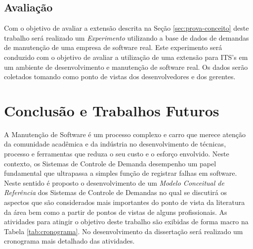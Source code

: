 \documentclass[msc,proposal,hidelot,hideabstract]{ppgccufmg} %
\begin{document}
\section{Avaliação}
\label{sec:avaliacao}

Com o objetivo de avaliar a extensão descrita na Seção \ref{sec:prova-conceito}
deste trabalho será realizado um \textit{Experimento}
\cite{wohlin2012experimentation} utilizando a base de dados de demandas de
manutenção de uma empresa de software real. Este experimento será conduzido com
o objetivo de avaliar a utilização de uma extensão para ITS's em um ambiente de
desenvolvimento e manutenção de software real. Os dados serão coletados tomando
como ponto de vistas dos desenvolvedores e dos gerentes.

\chapter{Conclusão e Trabalhos Futuros}
\label{ch:conclusao_trab_futuros}

A Manutenção de Software é um processo complexo e carro que merece atenção da
comunidade acadêmica e da indústria no desenvolvimento de técnicas, processo e
ferramentas que reduza o seu custo e o esforço envolvido. Neste contexto, os
Sistemas de Controle de Demanda desempenho um papel fundamental que ultrapassa
a simples função de registrar falhas em software. Neste sentido é proposto o
desenvolvimento de um  \textit{Modelo Conceitual de Referência} dos Sistemas de
Controle de Demandas no qual se discutirá os aspectos que são considerados mais importantes do ponto de vista da literatura da área bem como
a partir de pontos de vistas de alguns profissionais. As atividades para
atingir o objetivo deste trabalho são exibidas de forma macro na Tabela
\ref{tab:cronograma}. No desenvolvimento da dissertação será realizado um
cronograma mais detalhado das atividades.
\end{document}
